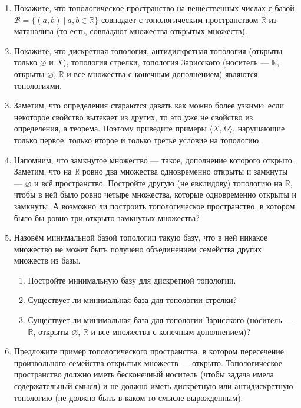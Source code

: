 \documentclass[10pt,a4paper,oneside]{article}
\begin{document}
\begin{enumerate}
\item Покажите, что топологическое пространство на вещественных числах с базой $\mathcal{B} = \{(a,b)\ |\ a,b \in \mathbb{R}\}$ совпадает
с топологическим пространством $\mathbb{R}$ из матанализа (то есть, совпадают множества открытых множеств).

\item Покажите, что дискретная топология, антидискретная топология (открыты только $\varnothing$ и $X$), топология стрелки, топология Зарисского
(носитель --- $\mathbb{R}$, открыты $\varnothing$, $\mathbb{R}$ и все множества с конечным дополнением) являются топологиями.

\item Заметим, что определения стараются давать как можно более узкими: если некоторое свойство вытекает из других, то это уже не свойство из определения, а теорема.
Поэтому приведите примеры $\langle X, \Omega\rangle$, нарушающие только первое, только второе и только третье условие на топологию.

\item Напомним, что замкнутое множество --- такое, дополнение которого открыто.
Заметим, что на $\mathbb{R}$ ровно два множества одновременно открыты и замкнуты --- $\varnothing$ и всё пространство. Постройте другую
(не евклидову) топологию на $\mathbb{R}$, чтобы в ней было ровно четыре множества, которые одновременно открыты и замкнуты. А возможно ли построить
топологическое пространство, в котором было бы ровно три открыто-замкнутых множества?

\item Назовём минимальной базой топологии такую базу, что в ней никакое множество не может быть получено объединением семейства других множеств из базы. 
\begin{enumerate}
\item Постройте минимальную базу для дискретной топологии.
\item Существует ли минимальная база для топологии стрелки?
\item Существует ли минимальная база для топологии Зарисского (носитель --- $\mathbb{R}$, открыты $\varnothing$, $\mathbb{R}$ и все множества с конечным дополнением)?
\end{enumerate}

\item Предложите пример топологического пространства, в котором пересечение произвольного семейства открытых множеств --- открыто.
Топологическое пространство должно иметь бесконечный носитель (чтобы задача имела содержательный смысл) и не должно иметь дискретную 
или антидискретную топологию (не должно быть в каком-то смысле вырожденным).


\end{enumerate}
\end{document}
